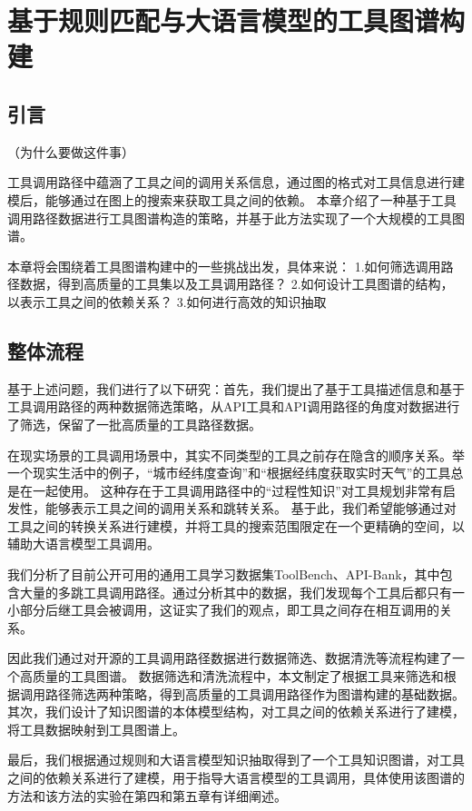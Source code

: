 \chapter{基于规则匹配与大语言模型的工具图谱构建}

\section{引言}

（为什么要做这件事）

工具调用路径中蕴涵了工具之间的调用关系信息，通过图的格式对工具信息进行建模后，能够通过在图上的搜索来获取工具之间的依赖。
本章介绍了一种基于工具调用路径数据进行工具图谱构造的策略，并基于此方法实现了一个大规模的工具图谱。

本章将会围绕着工具图谱构建中的一些挑战出发，具体来说：
1.如何筛选调用路径数据，得到高质量的工具集以及工具调用路径？
2.如何设计工具图谱的结构，以表示工具之间的依赖关系？
3.如何进行高效的知识抽取

\section{整体流程}

基于上述问题，我们进行了以下研究：首先，我们提出了基于工具描述信息和基于工具调用路径的两种数据筛选策略，从API工具和API调用路径的角度对数据进行了筛选，保留了一批高质量的工具路径数据。

在现实场景的工具调用场景中，其实不同类型的工具之前存在隐含的顺序关系。举一个现实生活中的例子，“城市经纬度查询”和“根据经纬度获取实时天气”的工具总是在一起使用。
这种存在于工具调用路径中的“过程性知识”对工具规划非常有启发性，能够表示工具之间的调用关系和跳转关系。
基于此，我们希望能够通过对工具之间的转换关系进行建模，并将工具的搜索范围限定在一个更精确的空间，以辅助大语言模型工具调用。

我们分析了目前公开可用的通用工具学习数据集ToolBench、API-Bank，其中包含大量的多跳工具调用路径。通过分析其中的数据，我们发现每个工具后都只有一小部分后继工具会被调用，这证实了我们的观点，即工具之间存在相互调用的关系。

因此我们通过对开源的工具调用路径数据进行数据筛选、数据清洗等流程构建了一个高质量的工具图谱。
数据筛选和清洗流程中，本文制定了根据工具来筛选和根据调用路径筛选两种策略，得到高质量的工具调用路径作为图谱构建的基础数据。
其次，我们设计了知识图谱的本体模型结构，对工具之间的依赖关系进行了建模，将工具数据映射到工具图谱上。

最后，我们根据通过规则和大语言模型知识抽取得到了一个工具知识图谱，对工具之间的依赖关系进行了建模，用于指导大语言模型的工具调用，具体使用该图谱的方法和该方法的实验在第四和第五章有详细阐述。

